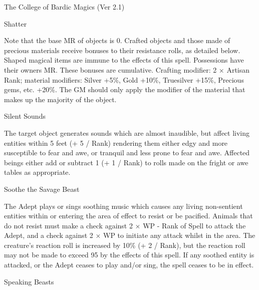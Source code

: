 \begin{Chapter}{The College of Bardic Magics (Ver 2.1)}
\begin{spell}[G-7]{Shatter}
\begin{effects}
Note that the base MR of objects is 0.  Crafted objects and those made
of precious materials receive bonuses to their resistance rolls, as
detailed below.  Shaped magical items are immune to the effects of
this spell. Possessions have their owners MR.  These bonuses are
cumulative. Crafting modifier: 2 × Artisan Rank; material modifiers:
Silver +5\%, Gold +10\%, Truesilver +15\%, Precious gems, etc.  +20\%.
The GM should only apply the modifier of the material that makes up
the majority of the object.
\end{effects}
\end{spell}

\begin{spell}[G-8]{Silent Sounds}

\begin{effects}
The target object generates sounds which are almost inaudible, but
affect living entities within 5 feet (+ 5 / Rank) rendering them
either edgy and more susceptible to fear and awe, or tranquil and less
prone to fear and awe.  Affected beings either add or subtract 1 (+ 1
/ Rank) to rolls made on the fright or awe tables as appropriate.
\end{effects}
\end{spell}

\begin{spell}[G-9]{Soothe the Savage Beast}

\begin{effects}
The Adept plays or sings soothing music which causes any living
non-sentient entities within or entering the area of effect to resist
or be pacified.  Animals that do not resist must make a check against
2 × WP - Rank of Spell to attack the Adept, and a check against 2 × WP
to initiate any attack whilst in the area.  The creature’s reaction
roll is increased by 10\% (+ 2 / Rank), but the reaction roll may not
be made to exceed 95 by the effects of this spell.  If any soothed
entity is attacked, or the Adept ceases to play and/or sing, the spell
ceases to be in effect.
\end{effects}
\end{spell}

\begin{spell}[G-10]{Speaking Beasts}


\end{spell}
\end{Chapter}
